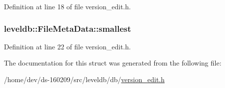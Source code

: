 Definition at line 18 of file version\+\_\+edit.\+h.

\hypertarget{structleveldb_1_1_file_meta_data_a9e5e5c149495aede836ac637cd89269f}{}
\subsubsection[{smallest}]{ leveldb\+::\+File\+Meta\+Data\+::smallest}\label{structleveldb_1_1_file_meta_data_a9e5e5c149495aede836ac637cd89269f}


Definition at line 22 of file version\+\_\+edit.\+h.



The documentation for this struct was generated from the following file\+:\begin{DoxyCompactItemize}
\item 
/home/dev/ds-\/160209/src/leveldb/db/\hyperlink{version__edit_8h}{version\+\_\+edit.\+h}\end{DoxyCompactItemize}
